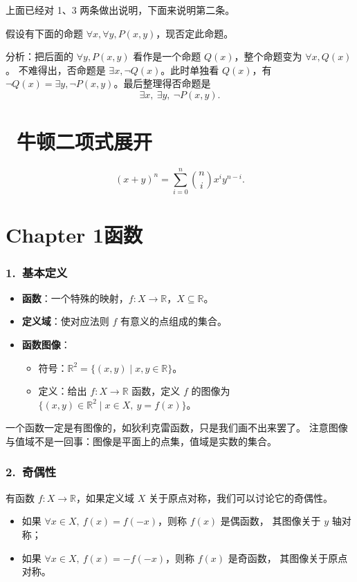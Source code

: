 \documentclass[UTF8,11pt]{ctexart}
\theoremstyle{cnthm}
\begin{document}
上面已经对 1、3 两条做出说明，下面来说明第二条。

假设有下面的命题 $\forall x,\forall y,P(x,y)$，现否定此命题。

分析：把后面的 $\forall y,P(x,y)$ 看作是一个命题 $Q(x)$，整个命题变为 $\forall x,Q(x)$。
不难得出，否命题是 $\exists x,\neg Q(x)$。此时单独看 $Q(x)$，有
$\neg Q(x)=\exists y,\neg P(x,y)$。最后整理得否命题是
\[
\exists x,\ \exists y,\ \neg P(x,y).
\]

\section{\ 牛顿二项式展开}

\[
(x+y)^n=\sum_{i=0}^{n}\binom{n}{i}x^iy^{n-i}.
\]

\section{Chapter 1\quad 函数}

\subsubsection*{1.\ 基本定义}

\begin{itemize}
\item \textbf{函数}：一个特殊的映射，$f:X\to\mathbb R$，$X\subseteq\mathbb R$。
\item \textbf{定义域}：使对应法则 $f$ 有意义的点组成的集合。
\item \textbf{函数图像}：
\begin{itemize}
\item 符号：$\mathbb R^2=\{(x,y)\mid x,y\in\mathbb R\}$。
\item 定义：给出 $f:X\to\mathbb R$ 函数，定义 $f$ 的图像为
$\{(x,y)\in\mathbb R^2\mid x\in X,\ y=f(x)\}$。
\end{itemize}
\end{itemize}

一个函数一定是有图像的，如狄利克雷函数，只是我们画不出来罢了。
注意图像与值域不是一回事：图像是平面上的点集，值域是实数的集合。

\subsubsection*{2.\ 奇偶性}

有函数 $f:X\to\mathbb R$，如果定义域 $X$ 关于原点对称，我们可以讨论它的奇偶性。

\begin{itemize}
\item 如果 $\forall x\in X,\ f(x)=f(-x)$，则称 $f(x)$ 是偶函数，
其图像关于 $y$ 轴对称；
\item 如果 $\forall x\in X,\ f(x)=-f(-x)$，则称 $f(x)$ 是奇函数，
其图像关于原点对称。
\end{itemize}
\end{document}
